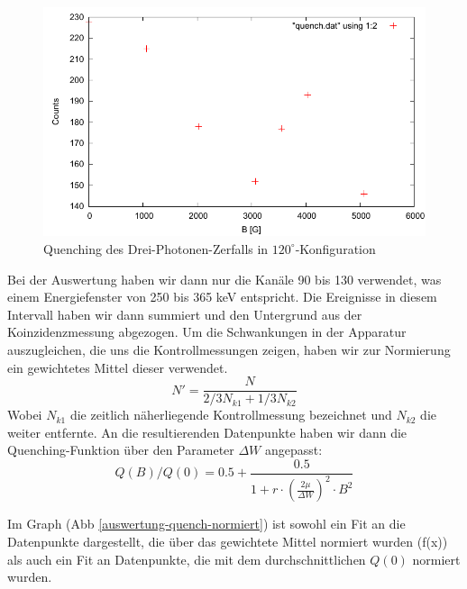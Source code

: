 \begin{figure}
 \includegraphics[width=\textwidth]{Auswertung/quench.pdf}
 \caption{Quenching des Drei-Photonen-Zerfalls in $120^\circ$-Konfiguration}
\end{figure}
Bei der Auswertung haben wir dann nur die Kanäle 90 bis 130 verwendet, was einem Energiefenster von 250 bis 365 keV entspricht. Die Ereignisse in diesem Intervall haben wir dann summiert und den Untergrund aus der Koinzidenzmessung abgezogen. Um die Schwankungen in der Apparatur auszugleichen, die uns die Kontrollmessungen zeigen, haben wir zur Normierung ein gewichtetes Mittel dieser verwendet.
\begin{equation*}
 N' = \frac{N}{2/3 N_{k1} + 1/3 N_{k2}}
\end{equation*}
Wobei $N_{k1}$ die zeitlich näherliegende Kontrollmessung bezeichnet und $N_{k2}$ die weiter entfernte. An die resultierenden Datenpunkte haben wir dann die Quenching-Funktion über den Parameter $\Delta W$ angepasst:
\begin{equation*}
 Q(B)/Q(0) = 0.5 + \frac{0.5}{1 + r \cdot ( \frac{2  \mu }{ \Delta W})^2 \cdot B^2} 
\end{equation*}


Im Graph (Abb \ref{auswertung-quench-normiert}) ist sowohl ein Fit an die Datenpunkte dargestellt, die über das gewichtete Mittel normiert wurden (f(x)) als auch ein Fit an Datenpunkte, die mit dem durchschnittlichen $Q(0)$ normiert wurden. 



